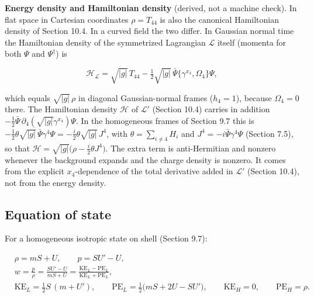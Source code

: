 \documentclass[11pt]{article}
\begin{document}
\textbf{Energy density and Hamiltonian density} (derived, not a machine check). In flat space in Cartesian coordinates $\rho=T_{44}$ is also the canonical Hamiltonian density of Section 10.4. In a curved field the two differ. In Gaussian normal time the Hamiltonian density of the symmetrized Lagrangian $\mathcal L$ itself (momenta for both $\Psi$ and $\Psi^\dagger$) is

\[
\mathcal H_{\mathcal L}=\sqrt{|g|}\,T_{44}-\tfrac12\sqrt{|g|}\,\bar\Psi\{\gamma^{x_4},\Omega_4\}\Psi ,
\]

which equals $\sqrt{|g|}\,\rho$ in diagonal Gaussian-normal frames ($h_4=1$), because $\Omega_4=0$ there. The Hamiltonian density $\mathcal H$ of $\mathcal L'$ (Section 10.4) carries in addition $-\tfrac12\bar\Psi\,\partial_4(\sqrt{|g|}\gamma^{x_4})\Psi$. In the homogeneous frames of Section 9.7 this is $-\tfrac12\theta\sqrt{|g|}\,\bar\Psi\gamma^4\Psi=-\tfrac i2\theta\sqrt{|g|}\,J^4$, with $\theta=\sum_{i\ne4}H_i$ and $J^4=-i\bar\Psi\gamma^4\Psi$ (Section 7.5), so that $\mathcal H=\sqrt{|g|}\bigl(\rho-\tfrac i2\theta J^4\bigr)$. The extra term is anti-Hermitian and nonzero whenever the background expands and the charge density is nonzero. It comes from the explicit $x_4$-dependence of the total derivative added in $\mathcal L'$ (Section 10.4), not from the energy density.

\subsection{Equation of state}

For a homogeneous isotropic state on shell (Section 9.7):

\[
\begin{aligned}
&\rho=mS+U,\qquad p=SU'-U,\\
&w=\frac{p}{\rho}=\frac{SU'-U}{mS+U}=\frac{\mathrm{KE}_L-\mathrm{PE}_L}{\mathrm{KE}_L+\mathrm{PE}_L},\\
&\mathrm{KE}_L=\tfrac12S\,(m+U'),\qquad \mathrm{PE}_L=\tfrac12\bigl(mS+2U-SU'\bigr),\qquad \mathrm{KE}_H=0,\qquad \mathrm{PE}_H=\rho .
\end{aligned}
\]
\end{document}
